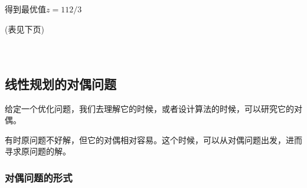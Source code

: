 \documentclass{book}
\begin{document}
得到最优值$z=112/3$

(表见下页)
\\
\\
\\

\subsection{线性规划的对偶问题}

给定一个优化问题，我们去理解它的时候，或者设计算法的时候，可以研究它的对偶。

有时原问题不好解，但它的对偶相对容易。这个时候，可以从对偶问题出发，进而寻求原问题的解。

\subsubsection{对偶问题的形式}
\end{document}
